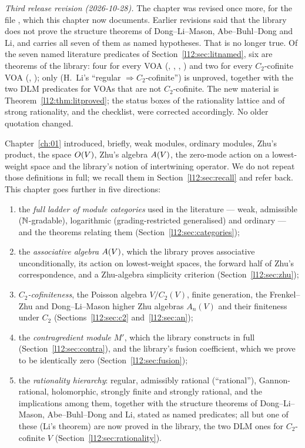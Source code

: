 \emph{Third release revision (2026-10-28).} The chapter was revised once more, for the file , which this chapter now documents. Earlier revisions said that the library does not prove the
structure theorems of Dong--Li--Mason, Abe--Buhl--Dong and Li, and carries all seven of them as named hypotheses. That is no
longer true. Of the seven named literature predicates of Section~\ref{l12:sec:litnamed}, six are theorems of the library: four for
every VOA (, , ,
) and two for every $C_2$-cofinite VOA (,
); only  (H.~Li's ``regular $\Rightarrow C_2$-cofinite'')
is unproved, together with the two DLM predicates for VOAs that are not $C_2$-cofinite. The new material is
Theorem~\ref{l12:thm:litproved}; the status boxes of the rationality lattice and of strong rationality, and the checklist,
were corrected accordingly. No older quotation changed.

Chapter~\ref{ch:01} introduced, briefly, weak modules, ordinary modules, Zhu's product, the space
$O(V)$, Zhu's algebra $A(V)$, the zero-mode action on a lowest-weight space and the
library's notion of intertwining operator. We do not repeat those definitions in full; we recall
them in Section~\ref{l12:sec:recall} and refer back. This chapter goes further in five directions:
\begin{enumerate}
\item the \emph{full ladder of module categories} used in the literature --- weak, admissible
  (${\mathbb{N}}$-gradable), logarithmic (grading-restricted generalised) and ordinary --- and the theorems
  relating them (Section~\ref{l12:sec:categories});
\item the \emph{associative algebra} $A(V)$, which the library proves associative
  unconditionally, its action on lowest-weight spaces, the forward half of Zhu's correspondence, and
  a Zhu-algebra simplicity criterion (Section~\ref{l12:sec:zhu});
\item \emph{$C_2$-cofiniteness}, the Poisson algebra $V/C_2(V)$, finite generation, the Frenkel--Zhu
  and Dong--Li--Mason higher Zhu algebras $A_n(V)$ and their finiteness under $C_2$
  (Sections~\ref{l12:sec:c2} and~\ref{l12:sec:an});
\item the \emph{contragredient module} $M'$, which the library constructs in full
  (Section~\ref{l12:sec:contra}), and the library's fusion coefficient, which we prove to be
  identically zero (Section~\ref{l12:sec:fusion});
\item the \emph{rationality hierarchy}: regular, admissibly rational (``rational''),
  Gannon-rational, holomorphic, strongly finite and strongly rational, and the implications among
  them, together with the structure theorems of Dong--Li--Mason, Abe--Buhl--Dong and Li, stated as named predicates;
  all but one of these (Li's theorem) are now proved in the library, the two DLM ones for $C_2$-cofinite $V$
  (Section~\ref{l12:sec:rationality}).
\end{enumerate}


